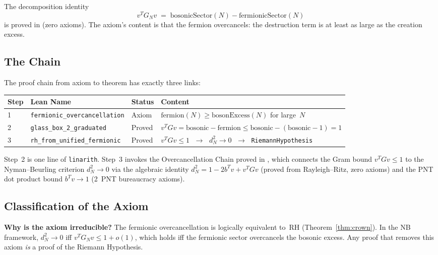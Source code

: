 \documentclass[11pt,a4paper]{article}
\begin{document}
\noindent
The decomposition identity
\[
  v^T G_N v \;=\; \mathrm{bosonicSector}(N) - \mathrm{fermionicSector}(N)
\]
is proved in  (zero axioms). The axiom's
content is that the fermion overcancels: the destruction term is at
least as large as the creation excess.

\subsection{The Chain}

The proof chain from axiom to theorem has exactly three links:

\begin{center}
\small
\begin{tabular}{@{}lllp{7cm}@{}}
\toprule
\textbf{Step} & \textbf{Lean Name} & \textbf{Status} & \textbf{Content} \\
\midrule
1 & {\tt fermionic\_overcancellation} & Axiom &
  $\mathrm{fermion}(N) \geq \mathrm{bosonExcess}(N)$ for large~$N$ \\
2 & {\tt glass\_box\_2\_graduated} & Proved &
  $v^T G v = \mathrm{bosonic} - \mathrm{fermion}
   \leq \mathrm{bosonic} - (\mathrm{bosonic} - 1) = 1$ \\
3 & {\tt rh\_from\_unified\_fermionic} & Proved &
  $v^T G v \leq 1$ $\;\to\;$ $d_N^2 \to 0$ $\;\to\;$
  {\tt RiemannHypothesis} \\
\bottomrule
\end{tabular}
\end{center}

\noindent
Step~2 is one line of {\tt linarith}. Step~3 invokes the
Overcancellation Chain proved in
, which connects
the Gram bound $v^T G v \leq 1$ to the Nyman--Beurling criterion
$d_N^2 \to 0$ via the algebraic identity
$d_N^2 = 1 - 2b^Tv + v^TGv$ (proved from Rayleigh--Ritz, zero axioms)
and the PNT dot product bound $b^Tv \to 1$ (2~PNT bureaucracy axioms).

\subsection{Classification of the Axiom}

\textbf{Why is the axiom irreducible?}
The fermionic overcancellation is logically equivalent to~RH
(Theorem~\ref{thm:crown}). In the NB framework, $d_N^2 \to 0$
iff $v^T G_N v \leq 1 + o(1)$, which holds iff the fermionic sector
overcancels the bosonic excess. Any proof that removes this axiom
\emph{is} a proof of the Riemann Hypothesis.
\end{document}
